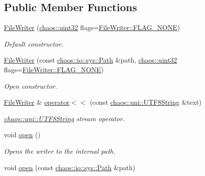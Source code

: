 \subsection*{Public Member Functions}
\begin{DoxyCompactItemize}
\item 
\hyperlink{classchaos_1_1io_1_1sys_1_1_file_writer_a84eee0f6699f145dd314201bbb60cab5}{File\-Writer} (\hyperlink{namespacechaos_a8641b3ae4551f0b35570d4f9f4ec22d9}{chaos\-::uint32} flags=\hyperlink{classchaos_1_1io_1_1sys_1_1_file_writer_aafcaef6dd3171373d8dfadadcc3c1b0bab1c0f867f11da4ed8678148548fa9458}{File\-Writer\-::\-F\-L\-A\-G\-\_\-\-N\-O\-N\-E})
\begin{DoxyCompactList}\small\item\em Default constructor. \end{DoxyCompactList}\item 
\hyperlink{classchaos_1_1io_1_1sys_1_1_file_writer_ade3f783fcaa44caf8ae1b3011e9847a1}{File\-Writer} (const \hyperlink{classchaos_1_1io_1_1sys_1_1_path}{chaos\-::io\-::sys\-::\-Path} \&path, \hyperlink{namespacechaos_a8641b3ae4551f0b35570d4f9f4ec22d9}{chaos\-::uint32} flags=\hyperlink{classchaos_1_1io_1_1sys_1_1_file_writer_aafcaef6dd3171373d8dfadadcc3c1b0bab1c0f867f11da4ed8678148548fa9458}{File\-Writer\-::\-F\-L\-A\-G\-\_\-\-N\-O\-N\-E})
\begin{DoxyCompactList}\small\item\em Open constructor. \end{DoxyCompactList}\item 
\hyperlink{classchaos_1_1io_1_1sys_1_1_file_writer}{File\-Writer} \& \hyperlink{classchaos_1_1io_1_1sys_1_1_file_writer_a4b94a57e0cde394a9a3ade4a5022dc43}{operator$<$$<$} (const \hyperlink{classchaos_1_1uni_1_1_u_t_f8_string}{chaos\-::uni\-::\-U\-T\-F8\-String} \&text)
\begin{DoxyCompactList}\small\item\em \hyperlink{classchaos_1_1uni_1_1_u_t_f8_string}{chaos\-::uni\-::\-U\-T\-F8\-String} stream operator. \end{DoxyCompactList}\item 
void \hyperlink{classchaos_1_1io_1_1sys_1_1_file_writer_a2ed0e1f9c6cdf4120e6c9b61cf14738a}{open} ()
\begin{DoxyCompactList}\small\item\em Opens the writer to the internal path. \end{DoxyCompactList}\item 
void \hyperlink{classchaos_1_1io_1_1sys_1_1_file_writer_ae979d1d88397de34ede7b023e5d4306a}{open} (const \hyperlink{classchaos_1_1io_1_1sys_1_1_path}{chaos\-::io\-::sys\-::\-Path} \&path)

\end{DoxyCompactItemize}
